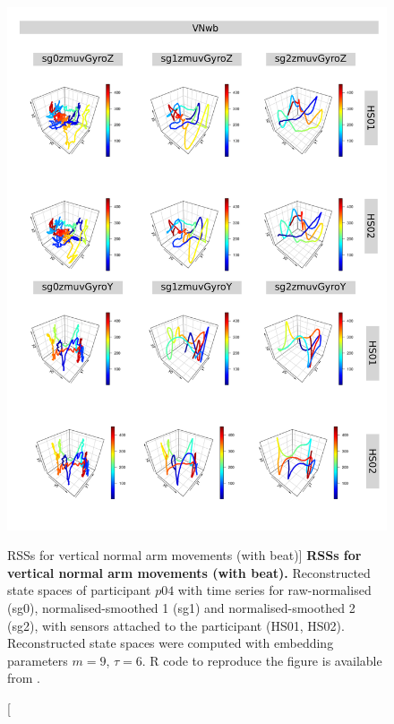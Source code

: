 \begin{figure}
\centering
\includegraphics[height=0.8\textheight]{rss_VNwb_p04}
\caption
	[RSSs for vertical normal arm movements (with beat)]{
	{\bf RSSs for vertical normal arm movements (with beat).}
	Reconstructed state spaces of participant $p04$
	with time series for raw-normalised (sg0), 
	normalised-smoothed 1 (sg1) and 
	normalised-smoothed 2 (sg2), 
	with sensors attached to the participant (HS01, HS02).
	Reconstructed state spaces were computed with 
	embedding parameters $m=9$, $\tau=6$.
	R code to reproduce the figure is available from \cite{hwum2018}.
        }
     \label{fig:rss_VNwb_p04}
\end{figure}






